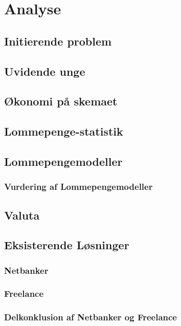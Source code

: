 \chapter{Analyse}

\section{Initierende problem}

\section{Uvidende unge}
\label{UvidendeUnge}

\section{Økonomi på skemaet}
\label{Okonomi}

\section{Lommepenge-statistik}
\label{LommeStat}

\section{Lommepengemodeller}
\label{LommeModeller}
\subsection{Vurdering af Lommepengemodeller}
\label{ModelVurdering}

\section{Valuta}
\label{Valuta}

\section{Eksisterende Løsninger}
\subsection{Netbanker}
\subsection{Freelance}
\subsection{Delkonklusion af Netbanker og Freelance}

